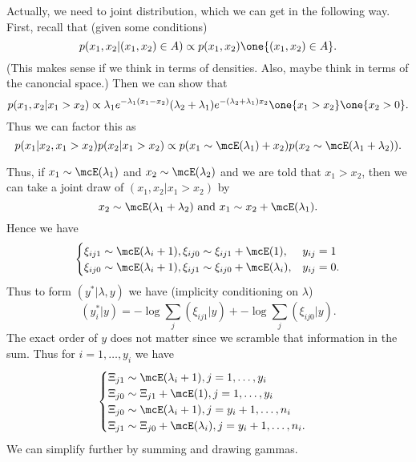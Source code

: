 \documentclass{article}
\begin{document}
Actually, we need to joint distribution, which we can get in the following way.
First, recall that (given some conditions)
\[
p(x_1, x_2 | (x_1, x_2) \in A) \propto p(x_1, x_2) \one \{ (x_1, x_2) \in A \}.
\]
(This makes sense if we think in terms of densities.  Also, maybe think in terms
of the canoncial space.)  Then we can show that
\[
p(x_1, x_2 | x_1 > x_2) \propto \lambda_1 e^{- \lambda_1 (x_1 - x_2)} 
(\lambda_2 + \lambda_1) e^{-(\lambda_2 + \lambda_1) x_2} \one \{x_1 > x_2\} \one
\{x_2 > 0 \}.
\]
Thus we can factor this as
\[
p(x_1 | x_2, x_1 > x_2) p(x_2 | x_1 > x_2) \propto p(x_1 \sim \mcE(\lambda_1) + x_2)
p(x_2 \sim \mcE(\lambda_1 + \lambda_2)).
\]

Thus, if $x_1 \sim \mcE(\lambda_1)$ and $x_2 \sim \mcE(\lambda_2)$ and we are
told that $x_1 > x_2$, then we can take a joint draw of $(x_1, x_2 | x_1 > x_2)$
by
\[
x_2 \sim \mcE(\lambda_1 + \lambda_2) \text{ and } 
x_1 \sim x_2 + \mcE(\lambda_1).
\]
Hence we have
\[
\begin{cases}
\xi_{ij1} \sim \mcE(\lambda_i + 1), \xi_{ij0} \sim \xi_{ij1} + \mcE(1), & y_{ij} =
1 \\
\xi_{ij0} \sim \mcE(\lambda_i + 1), \xi_{ij1} \sim \xi_{ij0} + \mcE(\lambda_i), &
y_{ij} = 0.
\end{cases}
\]
Thus to form $(y^*|\lambda,y)$ we have (implicity conditioning on $\lambda$)
\[
(y_{i}^* | y) = - \log \sum_{j} (\xi_{ij1}|y) + -\log \sum_{j} (\xi_{ij0}|y).
\]
The exact order of $y$ does not matter since we scramble that information in the
sum.  Thus for $i =1, \ldots, y_i$ we have
\[
\begin{cases}
\Xi_{j1} \sim \mcE(\lambda_i+1), j=1, \ldots, y_i \\
\Xi_{j0} \sim \Xi_{j1} + \mcE(1), j=1, \ldots, y_i \\
\Xi_{j0} \sim \mcE(\lambda_i+1), j=y_i+1, \ldots, n_i \\
\Xi_{j1} \sim \Xi_{j0} + \mcE(\lambda_i), j=y_i+1, \ldots, n_i.
\end{cases}
\]
We can simplify further by summing and drawing gammas.
\end{document}
